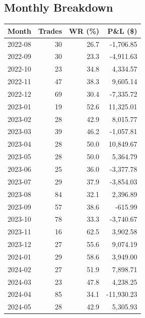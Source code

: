 \documentclass[11pt,a4paper,twoside]{article}
\begin{document}
\subsection{Monthly Breakdown}
\noindent\begin{center}
\begin{tabular}{>{\color{txtmain}}l rrr}
\toprule
\rowcolor{cardbg}
\textbf{Month} & \textbf{Trades} & \textbf{WR (\%)} & \textbf{P\&L (\$)} \\
\midrule
2022-08 & 30 & 26.7 & \textcolor{lossred}{-1,706.85} \\
2022-09 & 30 & 23.3 & \textcolor{lossred}{-4,911.63} \\
2022-10 & 23 & 34.8 & \textcolor{wingreen}{4,334.57} \\
2022-11 & 47 & 38.3 & \textcolor{wingreen}{9,605.14} \\
2022-12 & 69 & 30.4 & \textcolor{lossred}{-7,335.72} \\
2023-01 & 19 & 52.6 & \textcolor{wingreen}{11,325.01} \\
2023-02 & 28 & 42.9 & \textcolor{wingreen}{8,015.77} \\
2023-03 & 39 & 46.2 & \textcolor{lossred}{-1,057.81} \\
2023-04 & 28 & 50.0 & \textcolor{wingreen}{10,849.67} \\
2023-05 & 28 & 50.0 & \textcolor{wingreen}{5,364.79} \\
2023-06 & 25 & 36.0 & \textcolor{lossred}{-3,377.78} \\
2023-07 & 29 & 37.9 & \textcolor{lossred}{-3,854.03} \\
2023-08 & 84 & 32.1 & \textcolor{wingreen}{2,396.89} \\
2023-09 & 57 & 38.6 & \textcolor{lossred}{-615.99} \\
2023-10 & 78 & 33.3 & \textcolor{lossred}{-3,740.67} \\
2023-11 & 16 & 62.5 & \textcolor{wingreen}{3,902.58} \\
2023-12 & 27 & 55.6 & \textcolor{wingreen}{9,074.19} \\
2024-01 & 29 & 58.6 & \textcolor{wingreen}{3,949.00} \\
2024-02 & 27 & 51.9 & \textcolor{wingreen}{7,898.71} \\
2024-03 & 23 & 47.8 & \textcolor{wingreen}{4,238.25} \\
2024-04 & 85 & 34.1 & \textcolor{lossred}{-11,930.23} \\
2024-05 & 28 & 42.9 & \textcolor{wingreen}{5,305.93} \\

\end{tabular}
\end{center}
\end{document}
